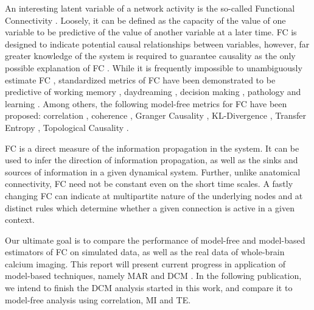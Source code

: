 \documentclass[a4paper,10pt]{article}
\begin{document}
An interesting latent variable of a network activity is the so-called Functional Connectivity \cite{friston_functional_2011, hutchison_dynamic_2013}. Loosely, it can be defined as the capacity of the value of one variable to be predictive of the value of another variable at a later time. FC is designed to indicate potential causal relationships between variables, however, far greater knowledge of the system is required to guarantee causality as the only possible explanation of FC \cite{wibral_directed_2014}. While it is frequently impossible to unambiguously estimate FC \cite{wibral_directed_2014}, standardized metrics of FC have been demonstrated to be predictive of working memory \cite{greicius_functional_2003, esposito_independent_2006}, daydreaming \cite{kucyi_dynamic_2014}, decision making \cite{lizier_multivariate_2010}, pathology \cite{sakoglu_classification_2009} and learning \cite{bassett_dynamic_2011}. Among others, the following model-free metrics for FC have been proposed: correlation \cite{greicius_persistent_2008, thompson_short-time_2012, viviani_resting_2011}, coherence \cite{pascual-marqui_isolated_2014}, Granger Causality \cite{zadeh_extension_1950, amblard_relation_2012, valdes-sosa_effective_2011, seth_granger_2015}, KL-Divergence \cite{amari_information_2001, nakahara_information-geometric_2002}, Transfer Entropy \cite{wibral_directed_2014, vicente_transfer_2010, nigam_rich-club_2016, lizier_differentiating_2010, lizier_multivariate_2010, ito_extending_2011, schreiber_measuring_2000}, Topological Causality \cite{harnack_topological_2017}.

FC is a direct measure of the information propagation in the system. It can be used to infer the direction of information propagation, as well as the sinks and sources of information in a given dynamical system. Further, unlike anatomical connectivity, FC need not be constant even on the short time scales. A fastly changing FC can indicate at multipartite nature of the underlying nodes and at distinct rules which determine whether a given connection is active in a given context.

Our ultimate goal is to compare the performance of model-free and model-based estimators of FC on simulated data, as well as the real data of whole-brain calcium imaging. This report will present current progress in application of model-based techniques, namely MAR \cite{penny_bayesian_2002} and DCM \cite{stephan_dynamic_2007, friston_functional_2011, frassle_regression_2017, jung_dynamic_2019}. In the following publication, we intend to finish the DCM analysis started in this work, and compare it to model-free analysis using correlation, MI and TE.
\end{document}
